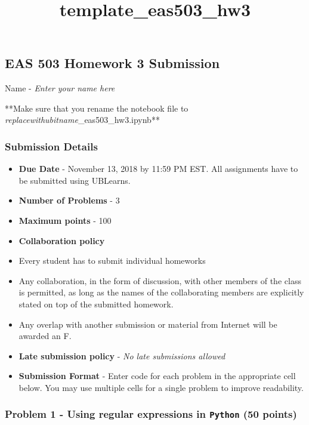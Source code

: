 \documentclass[11pt]{article}
\title{template\_eas503\_hw3}
\providecommand{\tightlist}{%
      \setlength{\itemsep}{0pt}\setlength{\parskip}{0pt}}
\begin{document}
    
    
    \maketitle
    
    

    
    \subsection{EAS 503 Homework 3
Submission}\label{eas-503-homework-3-submission}

Name - \emph{Enter your name here}

**Make sure that you rename the notebook file to
\emph{replacewithubitname}\_eas503\_hw3.ipynb**

\subsubsection{Submission Details}\label{submission-details}

\begin{itemize}
\tightlist
\item
  \textbf{Due Date} - November 13, 2018 by 11:59 PM EST. All assignments
  have to be submitted using UBLearns.
\item
  \textbf{Number of Problems} - 3
\item
  \textbf{Maximum points} - 100
\item
  \textbf{Collaboration policy}
\item
  Every student has to submit individual homeworks
\item
  Any collaboration, in the form of discussion, with other members of
  the class is permitted, as long as the names of the collaborating
  members are explicitly stated on top of the submitted homework.
\item
  Any overlap with another submission or material from Internet will be
  awarded an F.
\item
  \textbf{Late submission policy} - \emph{No late submissions allowed}
\item
  \textbf{Submission Format} - Enter code for each problem in the
  appropriate cell below. You may use multiple cells for a single
  problem to improve readability.
\end{itemize}

    \subsubsection{\texorpdfstring{Problem 1 - Using regular expressions in
\texttt{Python} (50
points)}{Problem 1 - Using regular expressions in Python (50 points)}}\label{problem-1---using-regular-expressions-in-python-50-points}
\end{document}
